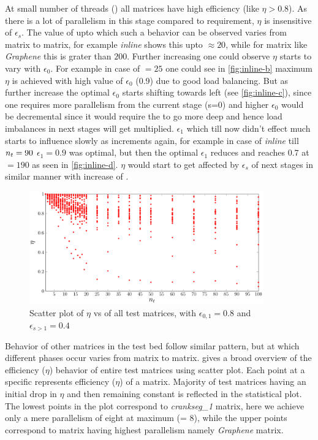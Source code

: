 At small number of threads (\nthreads) all matrices have high efficiency (like $\eta>0.8$). As there is a lot of parallelism in this stage compared to requirement, $\eta$ is insensitive of $\epsilon_s$. The value of \nthreads upto which such a behavior can be observed varies from matrix to matrix, for example \emph{inline} shows this upto \nthreads$\approx20$, while for matrix like \emph{Graphene} this is grater than $200$.  Further increasing \nthreads one could observe $\eta$ starts to vary with $\epsilon_0$. For example in case of \nthreads$ = 25$ one could see in \cref{fig:inline-b} maximum $\eta$ is achieved with high value of $\epsilon_0$ (0.9) due to good load balancing. But as 
\nthreads further increase the optimal $\epsilon_0$ starts shifting towards left (see \cref{fig:inline-c}),
 since one requires more parallelism from the current stage (s=0) and higher $\epsilon_0$ would be decremental since it would require the \levelTree to go more deep and hence load imbalances in next stages will get multiplied. $\epsilon_1$ which till now didn't effect much starts to influence slowly as \nthreads increments again, for example in case of \emph{inline} till $n_{t}=90$ $\epsilon_1=0.9$ was optimal, but then the optimal $\epsilon_1$ reduces and reaches $0.7$ at \nthreads$=190$ as seen in \cref{fig:inline-d}. $\eta$ would start to get affected by $\epsilon_s$ of next stages in similar manner with increase of \nthreads.
 
   \begin{figure}[tbhp]
   	\centering
   	\includegraphics[height=0.19\textheight,width=0.9\textwidth]{pics/param_study/scatter_plot}
   	\caption{Scatter plot of $\eta$ vs \nthreads of all test matrices, with $\epsilon_{0,1} = 0.8$ and $\epsilon_{s>1} = 0.4$}
   	\label{fig:param_all_mtx_stat}
   \end{figure}
   
Behavior of other matrices in the test bed follow similar pattern, but \nthreads at which different phases occur varies from matrix to matrix.   gives a broad overview of the efficiency ($\eta$) behavior of entire test matrices using scatter plot. Each point at a specific \nthreads represents efficiency ($\eta$) of a matrix. Majority of test matrices having an initial drop in $\eta$ and then remaining constant is reflected in the statistical plot. The lowest points in the plot correspond to \emph{crankseg\_1} matrix, here we achieve only a mere parallelism of eight at maximum (\threadEff = 8), while the upper points correspond to matrix having highest parallelism namely \emph{Graphene} matrix.

